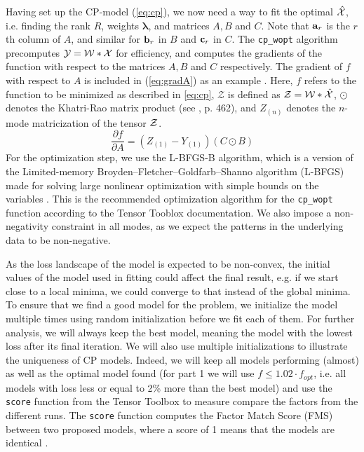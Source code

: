 Having set up the CP-model (\ref{eq:cp}), we now need a way to fit the optimal $\mathcal{\hat{X}}$, i.e. finding the rank $R$, weights $\boldsymbol{\lambda}$, and matrices $A, B$ and $C$.
Note that $\mathbf{a}_r$ is the $r$th column of $A$, and similar for $\mathbf{b}_r$ in $B$ and $\mathbf{c}_r$ in $C$.
The \texttt{cp\_wopt} algorithm precomputes $\mathcal{Y} = \mathcal{W} * \mathcal{X}$ for efficiency, and computes the gradients of the function with respect to the matrices $A, B$ and $C$ respectively.
The gradient of $f$ with respect to $A$ is included in (\ref{eq:gradA}) as an example \cite{cp-wopt}.
Here, $f$ refers to the function to be minimized as described in \ref{eq:cp}, $\mathcal{Z}$ is defined as $\mathcal{Z} = \mathcal{W} * \mathcal{\hat{X}}$, $\odot$ denotes the Khatri-Rao matrix product (see \textcite{tensor-review}, p. 462), and $Z_{(n)}$ denotes the $n$-mode matricization of the tensor $\mathcal{Z}$.
\begin{equation}
    \frac{\partial f}{\partial A} = (Z_{(1)} - Y_{(1)})(C \odot B) 
    \label{eq:gradA}
\end{equation}
For the optimization step, we use the L-BFGS-B algorithm, which is a version of the Limited-memory Broyden–Fletcher–Goldfarb–Shanno algorithm (L-BFGS) made for solving large nonlinear optimization with simple bounds on the variables \cite{lbfgsb}.
This is the recommended optimization algorithm for the \texttt{cp\_wopt} function according to the Tensor Tooblox documentation.
We also impose a non-negativity constraint in all modes, as we expect the patterns in the underlying data to be non-negative.

As the loss landscape of the model is expected to be non-convex, the initial values of the model used in fitting could affect the final result, e.g. if we start close to a local minima, we could converge to that instead of the global minima.
To ensure that we find a good model for the problem, we initialize the model multiple times using random initialization before we fit each of them.
For further analysis, we will always keep the best model, meaning the model with the lowest loss after its final iteration.
We will also use multiple initializations to illustrate the uniqueness of CP models.
Indeed, we will keep all models performing (almost) as well as the optimal model found (for part 1 we will use $f \leq 1.02\cdot f_{opt}$, i.e. all models with loss less or equal to 2\% more than the best model) and use the \texttt{score} function from the Tensor Toolbox \cite{tentool} to measure compare the factors from the different runs.
The \texttt{score} function computes the Factor Match Score (FMS) between two proposed models, where a score of 1 means that the models are identical \cite{unique}.

